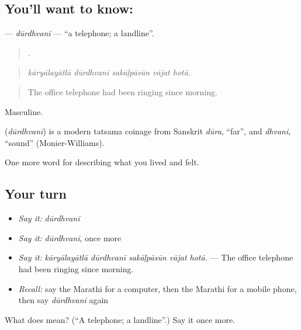 \subsection*{You'll want to know: }
\textbf{} — \emph{dūrdhvanī} — \textquotedblleft{}a telephone; a landline\textquotedblright{}.

\begin{quote}
    .
\end{quote}

\begin{quote}
\emph{kāryālayātlā dūrdhvanī sakāḷpāsūn vājat hotā.}
\end{quote}

\begin{quote}
The office telephone had been ringing since morning.
\end{quote}

Masculine.

\begin{cousinweb}
\textbf{} (\emph{dūrdhvanī}) is a modern tatsama coinage from Sanskrit \emph{dūra}, \textquotedblleft{}far\textquotedblright{}, and \emph{dhvani}, \textquotedblleft{}sound\textquotedblright{} (Monier-Williams).
\end{cousinweb}

\begin{grammarlens}[title={What you've built}]
One more word for describing what you lived and felt.
\end{grammarlens}

\subsection*{Your turn}
\begin{itemize}
\raggedright
  \item \emph{Say it:} \emph{dūrdhvanī}
  \item \emph{Say it:} \emph{dūrdhvanī}, once more
  \item \emph{Say it:} \emph{kāryālayātlā dūrdhvanī sakāḷpāsūn vājat hotā.} — The office telephone had been ringing since morning.
  \item \emph{Recall:} say the Marathi for a computer, then the Marathi for a mobile phone, then say \emph{dūrdhvanī} again
\end{itemize}

\begin{tcolorbox}[breakable,colback=teal!4,colframe=teal!35!black,title={Before you move on}]
What does  mean? (\textquotedblleft{}A telephone; a landline\textquotedblright{}.) Say it once more.
\end{tcolorbox}
